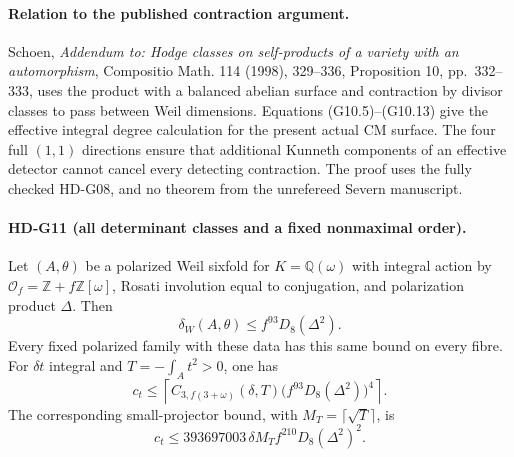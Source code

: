 \paragraph{Relation to the published contraction argument.}
Schoen, \emph{Addendum to: Hodge classes on self-products of a variety
with an automorphism}, Compositio Math. 114 (1998), 329--336,
Proposition 10, pp.~332--333, uses the product with a balanced
abelian surface and contraction by divisor classes to pass between
Weil dimensions. Equations (G10.5)--(G10.13) give the effective
integral degree calculation for the present actual CM surface.
The four full $(1,1)$ directions ensure that additional Kunneth
components of an effective detector cannot cancel every detecting
contraction. The proof uses the fully checked HD-G08, and no
theorem from the unrefereed Severn manuscript.

\paragraph{HD-G11 (all determinant classes and a fixed nonmaximal order).}
Let $(A,\theta)$ be a polarized Weil sixfold for $K=\mathbb Q(\omega)$
with integral action by $\mathcal O_f=\mathbb Z+f\mathbb Z[\omega]$,
Rosati involution equal to conjugation, and polarization product
$\Delta$. Then
\[
\boxed{\delta_W(A,\theta)\le f^{93}D_8(\Delta^2).}
\tag{G11.1}
\]
Every fixed polarized family with these data has this same bound
on every fibre. For $\delta t$ integral and
$T=-\int_A t^2>0$, one has
\[
\boxed{
c_t\le\left\lceil
C_{3,f(3+\omega)}(\delta,T)
\bigl(f^{93}D_8(\Delta^2)\bigr)^4
\right\rceil.}
\tag{G11.2}
\]
The corresponding small-projector bound, with
$M_T=\lceil\sqrt T\rceil$, is
\[
\boxed{c_t\le393697003\,\delta M_T f^{210}D_8(\Delta^2)^2.}
\tag{G11.5}
\]

